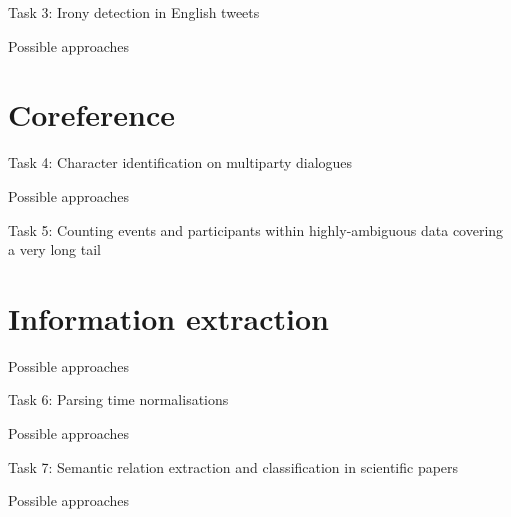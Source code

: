 \documentclass[10pt, compress]{beamer}
\begin{document}
\begin{frame}{Task 3: Irony detection in English tweets}


\end{frame}

\begin{frame}{Possible approaches}

\section{Coreference}

\end{frame}

\begin{frame}{Task 4: Character identification on multiparty dialogues}


\end{frame}

\begin{frame}{Possible approaches}


\end{frame}

\begin{frame}{Task 5: Counting events and participants within highly-ambiguous data covering a very long tail}


\end{frame}

\section{Information extraction}

\begin{frame}{Possible approaches}


\end{frame}

\begin{frame}{Task 6: Parsing time normalisations}


\end{frame}

\begin{frame}{Possible approaches}


\end{frame}

\begin{frame}{Task 7: Semantic relation extraction and classification in scientific papers}


\end{frame}

\begin{frame}{Possible approaches}


\end{frame}
\end{document}
